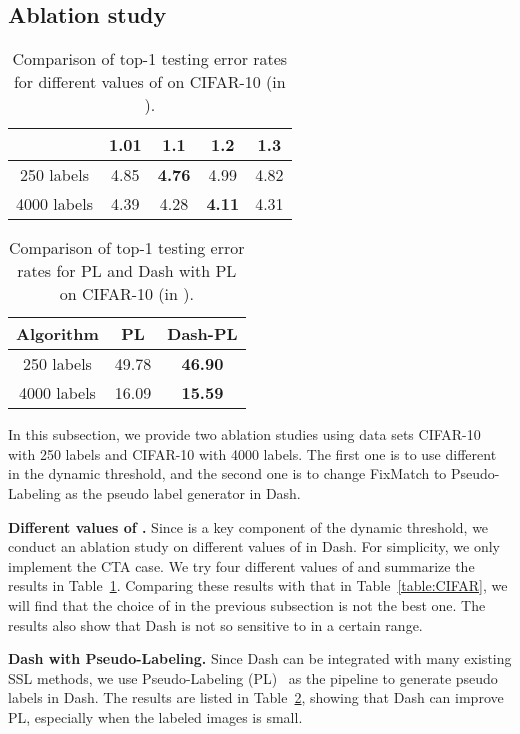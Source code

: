 \documentclass{article}
\begin{document}
\subsection{Ablation study}
\begin{table}[t]
\centering
\caption{Comparison of top-1 testing error rates for different values of  on CIFAR-10 (in ).}\label{table:diff:gamma}
\begin{tabular}{ccccc}
\hline
 & 1.01 & 1.1 & 1.2 & 1.3 \\ 
\hline
250 labels &  4.85 & {\bf4.76} & 4.99 & 4.82  \\
4000 labels & 4.39 &  4.28 & {\bf 4.11} & 4.31\\
\hline
\end{tabular}
\end{table}
\begin{table}[t]
\centering
\caption{Comparison of top-1 testing error rates for PL and Dash with PL on CIFAR-10 (in ).}\label{table:PL}
\begin{tabular}{ccc}
\hline
Algorithm & PL & Dash-PL \\ 
\hline
250 labels & 49.78 & {\bf 46.90}  \\
4000 labels & 16.09 & {\bf 15.59} \\
\hline
\end{tabular}
\end{table}
In this subsection, we provide two ablation studies using data sets CIFAR-10 with 250 labels and CIFAR-10 with 4000 labels. The first one is to use different  in the dynamic threshold, and the second one is to change FixMatch to Pseudo-Labeling as the pseudo label generator in Dash. 

{\bf Different values of .} Since  is a key component of the dynamic threshold, we conduct an ablation study on different values of  in Dash. For simplicity, we only implement the CTA case. We try four different values of  and summarize the results in Table~\ref{table:diff:gamma}. Comparing these results with that in Table~\ref{table:CIFAR}, we will find that the choice of  in the previous subsection is not the best one. The results also show that Dash is not so sensitive to  in a certain range.


{\bf Dash with Pseudo-Labeling.} Since Dash can be integrated with many existing SSL methods, we use Pseudo-Labeling (PL)~\citep{lee2013pseudo} as the pipeline to generate pseudo labels in Dash. The results are listed in Table~\ref{table:PL}, showing that Dash can improve PL, especially when the labeled images is small. 
\end{document}
